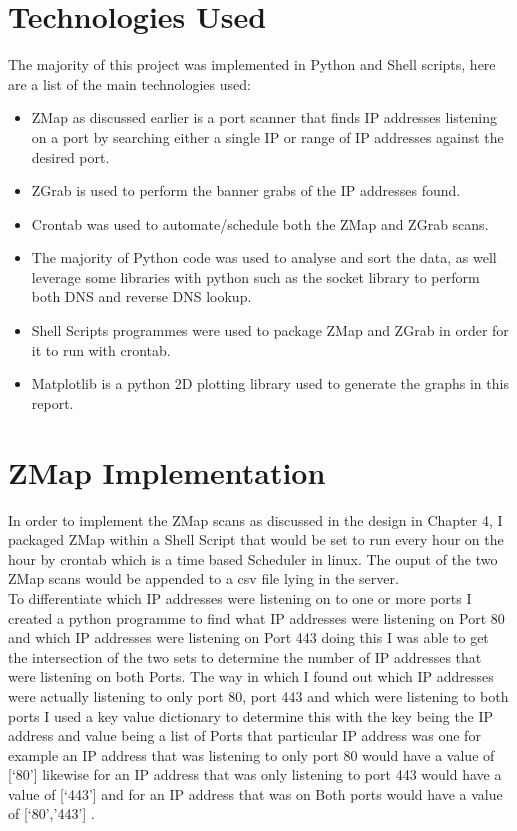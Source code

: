 \documentclass[a4wide,leqno,12pt]{report}
\begin{document}
\section{Technologies Used}
The majority of this project was implemented in Python and Shell scripts, here are a list of the main technologies used:
\begin{itemize}
  \item ZMap as discussed earlier is a port scanner that finds IP addresses listening on a port by searching either a single IP or range of IP addresses against the desired port.
  \item ZGrab is used to perform the banner grabs of the IP addresses found.
  \item Crontab was used to automate/schedule both the ZMap and ZGrab scans.
  \item The majority of Python code was used to analyse and sort the data, as well leverage some libraries with python such as the socket library \cite{socket} to perform both DNS and reverse DNS lookup.
  \item Shell Scripts programmes were used to package ZMap and ZGrab in order for it to run with crontab.
  \item Matplotlib \cite{matplotlib} is a python 2D plotting library used to generate the graphs in this report.
\end{itemize}

\section{ZMap Implementation}
In order to implement the ZMap scans as discussed in the design in Chapter 4, I packaged ZMap within a Shell Script that would be set to run every hour on the hour by crontab which is a time based Scheduler in linux. The ouput of the two ZMap scans would be appended to a csv file lying in the server.\\

To differentiate which IP addresses were listening on to one or more ports I created a python programme to find what IP addresses were listening on Port 80 and which IP addresses were listening on Port 443 doing this I was able to get the intersection of the two sets to determine the number of IP addresses that were listening on both Ports. The way in which I found out which IP addresses were actually listening to only port 80, port 443 and which were listening to both ports I used a key value dictionary to determine this with the key being the IP address and value being a list of Ports that particular IP address was one for example an IP address that was listening to only port 80 would have a value of [‘80’] likewise for an IP address that was only listening to port 443 would have a value of [‘443’] and for an IP address that was on Both ports would have a value of [‘80’,’443’] .
\end{document}
